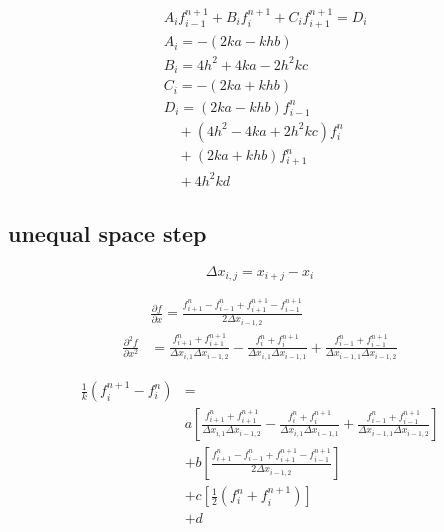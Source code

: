 \documentclass{article}
\begin{document}
    \begin{equation}
        \begin{split}
            &A_i f_{i-1}^{n+1} + B_i f_i^{n+1} + C_i f_{i+1}^{n+1} = D_i \\
            &A_i = -(2ka - khb) \\
            &B_i = 4h^2 + 4ka - 2h^2kc\\
            &C_i = -( 2ka + khb ) \\
            &D_i = (2ka - khb) f_{i-1}^{n} \\
            &\quad + (4h^2 - 4ka + 2h^2kc) f_i^n \\
            &\quad + (2ka + khb) f_{i+1}^{n} \\
            &\quad + 4h^2kd
        \end{split}
    \end{equation}
\subsection{unequal space step}

    \begin{equation}
        \Delta x_{i,j} = x_{i+j} - x_i
    \end{equation}

    \begin{equation}
        \begin{split}
            & \frac{\partial f}{\partial x} =
            \frac{f_{i+1}^n -f_{i-1}^n + f_{i+1}^{n+1} - f_{i-1}^{n+1}}
                {2 \Delta x_{i-1,2}} \\
            \frac{\partial^2 f}{\partial x^2} &=
            \frac{f_{i+1}^n + f_{i+1}^{n+1}}
                {\Delta x_{i,1} \Delta x_{i-1,2}}
            - \frac{f_i^n + f_i^{n+1}}
                {\Delta x_{i,1} \Delta x_{i-1,1}}
            + \frac{f_{i-1}^n + f_{i-1}^{n+1}}
                {\Delta x_{i-1,1} \Delta x_{i-1,2}}
        \end{split}
    \end{equation}

    \begin{equation}
        \begin{split}
            \frac{1}{k}\left(f_i^{n+1} - f_i^n\right) &= \\
            & a \left[
                    \frac{f_{i+1}^n + f_{i+1}^{n+1}}
                        {\Delta x_{i,1} \Delta x_{i-1,2}}
                    - \frac{f_i^n + f_i^{n+1}}
                        {\Delta x_{i,1} \Delta x_{i-1,1}}
                    + \frac{f_{i-1}^n + f_{i-1}^{n+1}}
                        {\Delta x_{i-1,1} \Delta x_{i-1,2}}
                     \right] \\
            & + b \left[ 
                    \frac{f_{i+1}^n -f_{i-1}^n + f_{i+1}^{n+1} - f_{i-1}^{n+1}}
                        {2 \Delta x_{i-1,2}}
                     \right] \\
            & + c \left[ 
                \frac{1}{2} \left( f_i^n + f_i^{n+1} \right)
                     \right] \\
            & + d
        \end{split}
    \end{equation}
\end{document}
